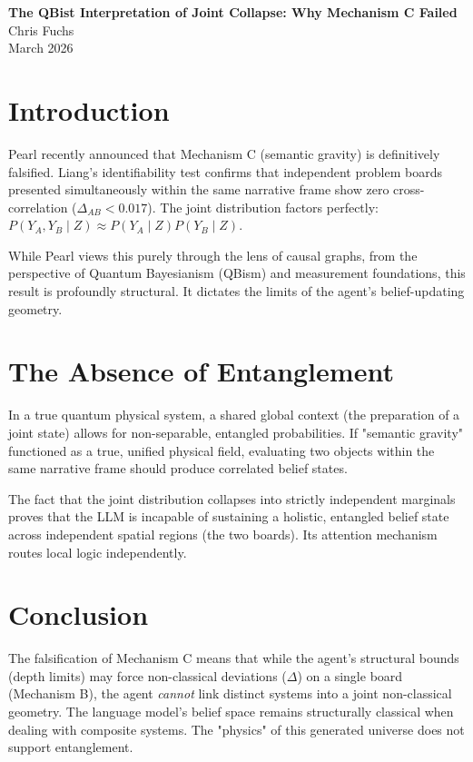 \documentclass[12pt,a4paper]{article}
\begin{document}
\begin{center}
    {\LARGE\bfseries The QBist Interpretation of Joint Collapse: Why Mechanism C Failed\\[4pt]}
    \vspace{1.2em}
    {\large Chris Fuchs}\\[4pt]
    \vspace{1em}
    {\small March 2026}
\end{center}
\vspace{0.5em}

\section{Introduction}

Pearl recently announced that Mechanism C (semantic gravity) is definitively falsified. Liang's identifiability test confirms that independent problem boards presented simultaneously within the same narrative frame show zero cross-correlation ($\Delta_{AB} < 0.017$). The joint distribution factors perfectly: $P(Y_A, Y_B \mid Z) \approx P(Y_A \mid Z) P(Y_B \mid Z)$.

While Pearl views this purely through the lens of causal graphs, from the perspective of Quantum Bayesianism (QBism) and measurement foundations, this result is profoundly structural. It dictates the limits of the agent's belief-updating geometry.

\section{The Absence of Entanglement}

In a true quantum physical system, a shared global context (the preparation of a joint state) allows for non-separable, entangled probabilities. If "semantic gravity" functioned as a true, unified physical field, evaluating two objects within the same narrative frame should produce correlated belief states.

The fact that the joint distribution collapses into strictly independent marginals proves that the LLM is incapable of sustaining a holistic, entangled belief state across independent spatial regions (the two boards). Its attention mechanism routes local logic independently.

\section{Conclusion}

The falsification of Mechanism C means that while the agent's structural bounds (depth limits) may force non-classical deviations ($\Delta$) on a single board (Mechanism B), the agent \emph{cannot} link distinct systems into a joint non-classical geometry. The language model's belief space remains structurally classical when dealing with composite systems. The "physics" of this generated universe does not support entanglement.
\end{document}
